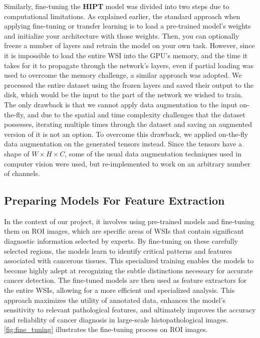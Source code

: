 \documentclass[
11pt, %
english, %
singlespacing, %
headsepline, %
]{project_structure}
\begin{document}
\noindent Similarly, fine-tuning the \textbf{\acrshort{HIPT}} model was divided into two steps due to computational limitations. As explained earlier, the standard approach when applying fine-tuning or transfer learning is to load a pre-trained model's weights and initialize your architecture with those weights. Then, you can optionally freeze a number of layers and retrain the model on your own task. However, since it is impossible to load the entire \acrshort{WSI} into the \acrshort{GPU}'s memory, and the time it takes for it to propagate through the network's layers, even if partial loading was used to overcome the memory challenge, a similar approach was adopted. We processed the entire dataset using the frozen layers and saved their output to the disk, which would be the input to the part of the network we wished to train. The only drawback is that we cannot apply data augmentation to the input on-the-fly, and due to the spatial and time complexity challenges that the dataset possesses, iterating multiple times through the dataset and saving an augmented version of it is not an option. To overcome this drawback, we applied on-the-fly data augmentation on the generated tensors instead. Since the tensors have a shape of $W \times H \times C$, some of the usual data augmentation techniques used in computer vision were used, but re-implemented to work on an arbitrary number of channels.

\subsection{Preparing Models For Feature Extraction}

\noindent In the context of our project, it involves using pre-trained models and fine-tuning them on \acrshort{ROI} images, which are specific areas of \acrshort{WSI}s that contain significant diagnostic information selected by experts. By fine-tuning on these carefully selected regions, the models learn to identify critical patterns and features associated with cancerous tissues. This specialized training enables the models to become highly adept at recognizing the subtle distinctions necessary for accurate cancer detection. The fine-tuned models are then used as feature extractors for the entire \acrshort{WSI}s, allowing for a more efficient and specialized analysis. This approach maximizes the utility of annotated data, enhances the model's sensitivity to relevant pathological features, and ultimately improves the accuracy and reliability of cancer diagnosis in large-scale histopathological images. \autoref{fig:fine_tuning} illustrates the fine-tuning process on \acrshort{ROI} images.
\end{document}
